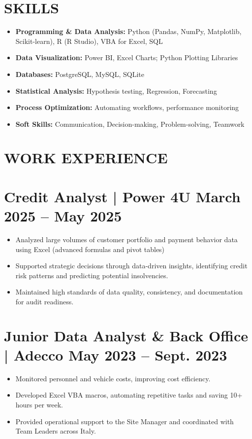 \documentclass[a4paper,10pt]{article}
\newcommand{\datedsection}[2]{%
  \section*{#1 \hfill \small #2}%
}
\begin{document}
\section*{SKILLS}
\begin{itemize}[leftmargin=*, label={$\bullet$}]
    \item \textbf{Programming \& Data Analysis:} Python (Pandas, NumPy, Matplotlib, Scikit-learn), R (R Studio), VBA for Excel, SQL
    \item \textbf{Data Visualization:} Power BI, Excel Charts; Python Plotting Libraries
    \item \textbf{Databases:} PostgreSQL, MySQL, SQLite
    \item \textbf{Statistical Analysis:} Hypothesis testing, Regression, Forecasting
    \item \textbf{Process Optimization:} Automating workflows, performance monitoring
    \item \textbf{Soft Skills:} Communication, Decision-making, Problem-solving, Teamwork
\end{itemize}

\section*{WORK EXPERIENCE}
\datedsection{Credit Analyst | Power 4U}{March 2025 -- May 2025}
\begin{itemize}[leftmargin=*, label={$\bullet$}]
    \item Analyzed large volumes of customer portfolio and payment behavior data using Excel (advanced formulas and pivot tables)
    \item Supported strategic decisions through data-driven insights, identifying credit risk patterns and predicting potential insolvencies.
    \item Maintained high standards of data quality, consistency, and documentation for audit readiness.
\end{itemize}

\datedsection{Junior Data Analyst \& Back Office | Adecco}{May 2023 -- Sept. 2023}
\begin{itemize}[leftmargin=*, label={$\bullet$}]
    \item Monitored personnel and vehicle costs, improving cost efficiency.
    \item Developed Excel VBA macros, automating repetitive tasks and saving 10+ hours per week.
    \item Provided operational support to the Site Manager and coordinated with Team Leaders across Italy.
\end{itemize}
\end{document}
